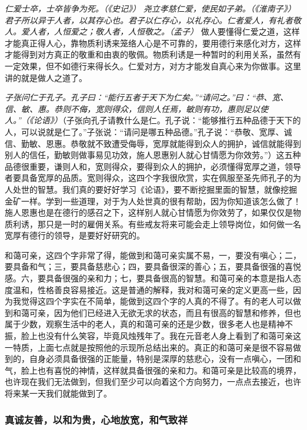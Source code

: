 \textit{仁爱士卒，士卒皆争为死。（《史记》）} \textit{尧立孝慈仁爱，使民如子弟。（《淮南子》）} \textit{君子所以异于人者，以其存心也。君子以仁存心，以礼存心。仁者爱人，有礼者敬人。爱人者，人恒爱之；敬人者，人恒敬之。（孟子）} 做人要懂得仁爱之道，这样才能真正得人心，靠物质利诱来笼络人心是不可靠的，要用德行来感化对方，这样才能得到对方真正的敬重和由衷的敬佩。物质利诱是一种暂时的利用关系，虽然有一定效果，但不如德行来得长久。仁爱对方，对方才能发自真心来为你做事。这里讲的就是做人之道了。

\textit{子张问仁于孔子。孔子曰：“能行五者于天下为仁矣。”“请问之。”曰：“恭、宽、信、敏、惠。恭则不侮，宽则得众，信则人任焉，敏则有功，惠则足以使人。”（《论语》）}（子张向孔子请教什么是仁。孔子说：“能够推行五种品德于天下的人，可以说就是仁了。”子张说：“请问是哪五种品德。”孔子说：“恭敬、宽厚、诚信、勤敏、恩惠。恭敬就不致遭受侮辱，宽厚就能得到众人的拥护，诚信就能得到别人的信任，勤敏则做事易见功效，施人恩惠别人就心甘情愿为你效劳。”）这五种品德很重要，谦则人和，宽则得众，要得到众人的拥护，必须懂得宽厚之道，领导者要具备宽厚的品质。宽则得众，这四个字我很欣赏，实在佩服至圣先师孔子的为人处世的智慧。我们真的要好好学习《论语》，要不断挖掘里面的智慧，就像挖掘金矿一样。学到一些道理，对于为人处世真的很有帮助，因为你知道该怎么做了！施人恩惠也是在德行的感召之下，这样别人就心甘情愿为你效劳了，如果仅仅是物质利诱，那只是一时的雇佣关系。有些戒友将来可能会走上领导岗位，如何做一名宽厚有德行的领导，是要好好研究的。

和蔼可亲，这四个字非常了得，能做到和蔼可亲实属不易，一，要没有嗔心；二，要具备和气；三，要具备慈悲心；四，要具备很深的善心；五，要具备很强的喜悦感。六，要具备很强的亲和力；七，要具备很高的智慧。和蔼可亲的本意是指人态度温和，性格善良容易接近。这是普通的解释，我对和蔼可亲的定义更高一些，因为我觉得这四个字实在不简单，能做到这四个字的人真的不得了。有的老人可以做到和蔼可亲，因为他们已经进入无欲无求的状态，而且有很高的智慧和修养，但也属于少数，观察生活中的老人，真的和蔼可亲的还是少数，很多老人也是精神不振，脸上也没有什么笑容，毕竟风烛残年了。我在元音老人身上看到了和蔼可亲这一特质，上面七点就是按照他的示现所总结出来的。真正的和蔼可亲是很不容易做到的，自身必须具备很强的正能量，特别是深厚的慈悲心，没有一点嗔心，一团和气，脸上也有喜悦的神情，这样就具备很强的亲和力。和蔼可亲是比较高的境界，也许现在我们无法做到，但我们至少可以向着这个方向努力，一点点去接近，也许将来某一天我们就能做到了。

\subsubsection{真诚友善，以和为贵，心地放宽，和气致祥}

